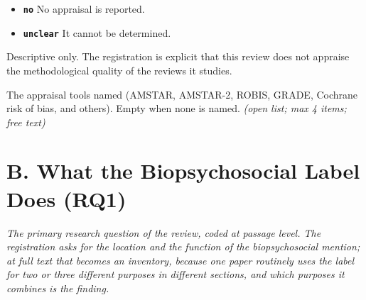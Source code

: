 \documentclass[11pt]{article}
\begin{document}
\begin{description}
\begin{itemize}[leftmargin=1.3em,itemsep=2pt,topsep=2pt]
  \item \textbf{\texttt{no}} No appraisal is reported.
  \item \textbf{\texttt{unclear}} It cannot be determined.
  \end{itemize}
{\small Descriptive only. The registration is explicit that this review does not appraise the methodological quality of the reviews it studies.}
\item[\texttt{quality\_assessment\_tools}] The appraisal tools named (AMSTAR, AMSTAR-2, ROBIS, GRADE, Cochrane risk of bias, and others). Empty when none is named. \textit{(open list; max 4 items; free text)}
\end{description}

\section*{B. What the Biopsychosocial Label Does (RQ1)}
{\small\itshape The primary research question of the review, coded at passage level. The registration asks for the location and the function of the biopsychosocial mention; at full text that becomes an inventory, because one paper routinely uses the label for two or three different purposes in different sections, and which purposes it combines is the finding.}\par\smallskip
\end{document}
